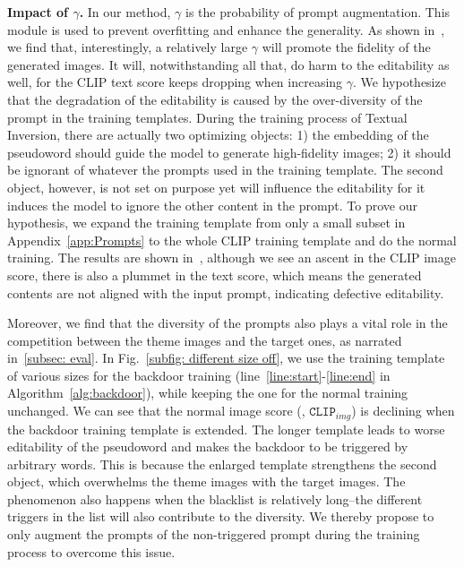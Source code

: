 \vspace{.3em}
\noindent \textbf{Impact of $\gamma$.}
In our method, $\gamma$ is the probability of prompt augmentation. This module is used to prevent overfitting and enhance the generality. As shown in~, we find that, interestingly, a relatively large $\gamma$ will promote the fidelity of the generated images. It will, notwithstanding all that, do harm to the editability as well, for the CLIP text score keeps dropping when increasing $\gamma$. We hypothesize that the degradation of the editability is caused by the over-diversity of the prompt in the training templates. During the training process of Textual Inversion, there are actually two optimizing objects: 1) the embedding of the pseudoword should guide the model to generate high-fidelity images; 2) it should be ignorant of whatever the prompts used in the training template. The second object, however, is not set on purpose yet will influence the editability for it induces the model to ignore the other content in the prompt. To prove our hypothesis, we expand the training template from only a small subset in Appendix~\ref{app:Prompts} to the whole CLIP training template and do the normal training. The results are shown in~, although we see an ascent in the CLIP image score, there is also a plummet in the text score, which means the generated contents are not aligned with the input prompt, indicating defective editability. 

Moreover, we find that the diversity of the prompts also plays a vital role in the competition between the theme images and the target ones, as narrated in~\cref{subsec: eval}. In Fig.~\ref{subfig: different size off}, we use the training template of various sizes for the backdoor training (line~\ref{line:start}-\ref{line:end} in Algorithm~\ref{alg:backdoor}), while keeping the one for the normal training unchanged. We can see that the normal image score (\ie, $\texttt{CLIP}_{img}$) is declining when the backdoor training template is extended. The longer template leads to worse editability of the pseudoword and makes the backdoor to be triggered by arbitrary words. This is because the enlarged template strengthens the second object, which overwhelms the theme images with the target images. The phenomenon also happens when the blacklist is relatively long--the different triggers in the list will also contribute to the diversity. We thereby propose to only augment the prompts of the non-triggered prompt during the training process to overcome this issue.



